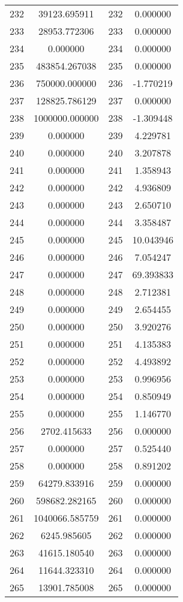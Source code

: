 \documentclass[12pt]{article}
\begin{document}
\begin{longtable}{@{}cccc@{}}
232 & 39123.695911 & 232 & 0.000000 \\
233 & 28953.772306 & 233 & 0.000000 \\
234 & 0.000000 & 234 & 0.000000 \\
235 & 483854.267038 & 235 & 0.000000 \\
236 & 750000.000000 & 236 & -1.770219 \\
237 & 128825.786129 & 237 & 0.000000 \\
238 & 1000000.000000 & 238 & -1.309448 \\
239 & 0.000000 & 239 & 4.229781 \\
240 & 0.000000 & 240 & 3.207878 \\
241 & 0.000000 & 241 & 1.358943 \\
242 & 0.000000 & 242 & 4.936809 \\
243 & 0.000000 & 243 & 2.650710 \\
244 & 0.000000 & 244 & 3.358487 \\
245 & 0.000000 & 245 & 10.043946 \\
246 & 0.000000 & 246 & 7.054247 \\
247 & 0.000000 & 247 & 69.393833 \\
248 & 0.000000 & 248 & 2.712381 \\
249 & 0.000000 & 249 & 2.654455 \\
250 & 0.000000 & 250 & 3.920276 \\
251 & 0.000000 & 251 & 4.135383 \\
252 & 0.000000 & 252 & 4.493892 \\
253 & 0.000000 & 253 & 0.996956 \\
254 & 0.000000 & 254 & 0.850949 \\
255 & 0.000000 & 255 & 1.146770 \\
256 & 2702.415633 & 256 & 0.000000 \\
257 & 0.000000 & 257 & 0.525440 \\
258 & 0.000000 & 258 & 0.891202 \\
259 & 64279.833916 & 259 & 0.000000 \\
260 & 598682.282165 & 260 & 0.000000 \\
261 & 1040066.585759 & 261 & 0.000000 \\
262 & 6245.985605 & 262 & 0.000000 \\
263 & 41615.180540 & 263 & 0.000000 \\
264 & 11644.323310 & 264 & 0.000000 \\
265 & 13901.785008 & 265 & 0.000000 \\

\end{longtable}
\end{document}
